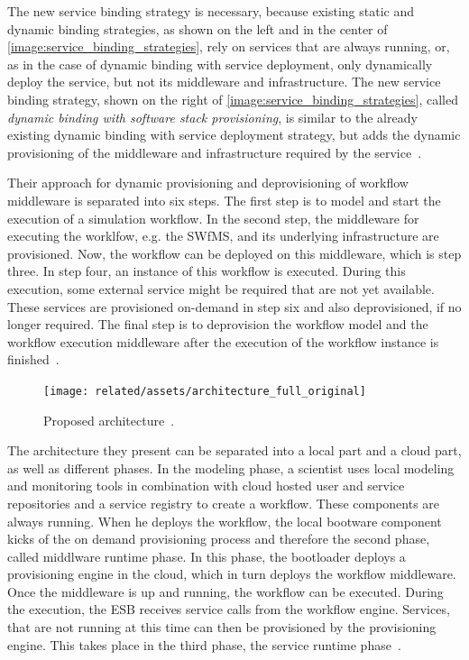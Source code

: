 The new service binding strategy is necessary, because existing static and dynamic binding strategies, as shown on the left and in the center of \autoref{image:service_binding_strategies}, rely on services that are always running, or, as in the case of dynamic binding with service deployment, only dynamically deploy the service, but not its middleware and infrastructure. The new service binding strategy, shown on the right of \autoref{image:service_binding_strategies}, called \textit{dynamic binding with software stack provisioning}, is similar to the already existing dynamic binding with service deployment strategy, but adds the dynamic provisioning of the middleware and infrastructure required by the service~\autocite{provisioning:ondemand}.

Their approach for dynamic provisioning and deprovisioning of workflow middleware is separated into six steps. The first step is to model and start the execution of a simulation workflow. In the second step, the middleware for executing the worklfow, e.g. the SWfMS, and its underlying infrastructure are provisioned. Now, the workflow can be deployed on this middleware, which is step three. In step four, an instance of this workflow is executed. During this execution, some external service might be required that are not yet available. These services are provisioned on-demand in step six and also deprovisioned, if no longer required. The final step is to deprovision the workflow model and the workflow execution middleware after the execution of the workflow instance is finished~\autocite{provisioning:ondemand}.

\begin{figure}[!htbp]
	\centering
	\texttt{[image: related/assets/architecture\_full\_original]}
	\caption{Proposed architecture~\autocite[based on][]{provisioning:ondemand}.}
	\label{image:architecture_full_original}
\end{figure}

The architecture they present can be separated into a local part and a cloud part, as well as different phases. In the modeling phase, a scientist uses local modeling and monitoring tools in combination with cloud hosted user and service repositories and a service registry to create a workflow. These components are always running. When he deploys the workflow, the local bootware component kicks of the on demand provisioning process and therefore the second phase, called middlware runtime phase. In this phase, the bootloader deploys a provisioning engine in the cloud, which in turn deploys the workflow middleware. Once the middleware is up and running, the workflow can be executed. During the execution, the ESB receives service calls from the workflow engine. Services, that are not running at this time can then be provisioned by the provisioning engine. This takes place in the third phase, the service runtime phase~\autocite{provisioning:ondemand}.
